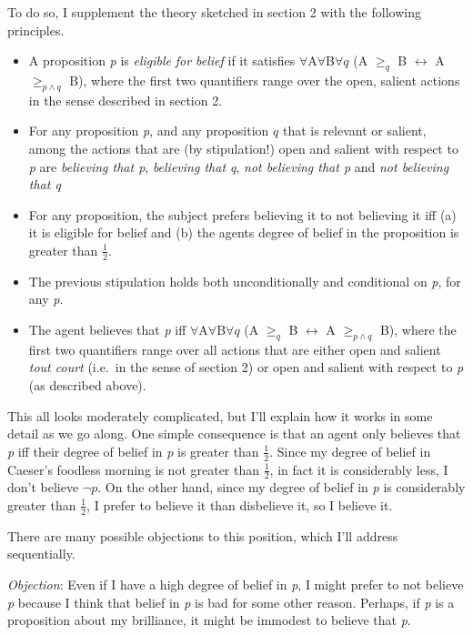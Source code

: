 \documentclass[
  11pt,
  letterpaper,
  DIV=11,
  numbers=noendperiod,
  oneside]{scrartcl}
\begin{document}
To do so, I supplement the theory sketched in section 2 with the
following principles.

\begin{itemize}
\item
  A proposition \emph{p} is \emph{eligible} \emph{for belief} if it
  satisfies \(\forall\)A\(\forall\)B\(\forall q\) (A \(\geq _q\) B
  \(\leftrightarrow\) A \(\geq _{p \wedge q}\) B), where the first two
  quantifiers range over the open, salient actions in the sense
  described in section 2.
\item
  For any proposition \emph{p}, and any proposition \(q\) that is
  relevant or salient, among the actions that are (by stipulation!) open
  and salient with respect to \emph{p} are \emph{believing that p},
  \emph{believing that q}, \emph{not believing that p} and \emph{not
  believing that q}
\item
  For any proposition, the subject prefers believing it to not believing
  it iff (a) it is eligible for belief and (b) the agents degree of
  belief in the proposition is greater than \(\frac{1}{2}\).
\item
  The previous stipulation holds both unconditionally and conditional on
  \emph{p}, for any \emph{p}.
\item
  The agent believes that \emph{p} iff
  \(\forall\)A\(\forall\)B\(\forall q\) (A \(\geq _q\) B
  \(\leftrightarrow\) A \(\geq _{p \wedge q}\) B), where the first two
  quantifiers range over all actions that are either open and salient
  \emph{tout court} (i.e.~in the sense of section 2) or open and salient
  with respect to \emph{p} (as described above).
\end{itemize}

This all looks moderately complicated, but I'll explain how it works in
some detail as we go along. One simple consequence is that an agent only
believes that \emph{p} iff their degree of belief in \emph{p} is greater
than \(\frac{1}{2}\). Since my degree of belief in Caeser's foodless
morning is not greater than \(\frac{1}{2}\), in fact it is considerably
less, I don't believe \(\neg p\). On the other hand, since my degree of
belief in \emph{p} is considerably greater than \(\frac{1}{2}\), I
prefer to believe it than disbelieve it, so I believe it.

There are many possible objections to this position, which I'll address
sequentially.

\emph{Objection}: Even if I have a high degree of belief in \emph{p}, I
might prefer to not believe \emph{p} because I think that belief in
\emph{p} is bad for some other reason. Perhaps, if \emph{p} is a
proposition about my brilliance, it might be immodest to believe that
\emph{p}.
\end{document}
